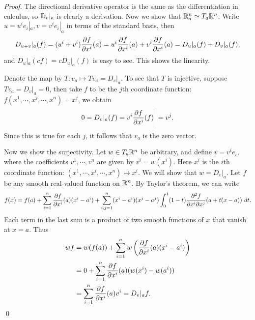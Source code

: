 \begin{proof}
    The directional derivative operator is the same as the differentiation in calculus, so $\mathbb{D}_v|_a$ is clearly a derivation. Now we show that $\mathbb{R}_a^n \simeq T_a \mathbb{R}^n$. Write $u = u^i e_i|_a, v = v^i e_i|_a$ in terms of the standard basis, then 
    $$D_{u+v}|_a(f) = (u^i+v^i){\pdv{f}{x^i}}(a) = u^i{\pdv{f}{x^i}}(a) + v^i{\pdv{f}{x^i}}(a) = D_u|_a(f) + D_v|_a(f), $$
    and $D_u|_a(cf) = cD_u|_a(f)$ is easy to see. This shows the linearity. 

    Denote the map by $T: v_a \mapsto Tv_a = D_v|_a$. To see that $T$ is injective, suppose $Tv_a = D_v|_a = 0$, then take $f$ to be the $j$th coordinate function: $f(x^1, \cdots, x^j, \cdots, x^n) = x^j$, we obtain
    $$0 = D_v|_a(f) = v^i {\pdv{f}{x^i}}(f)\bigg| = v^j. $$
    Since this is true for each $j$, it follows that $v_a$ is the zero vector. 

    Now we show the surjectivity. Let $w \in T_a\mathbb{R}^n$ be arbitrary, and define $v = v^i e_i$, where the coefficients $v^1, \cdots, v^n$ are given by 
    $v^i = w(x^i)$. Here $x^i$ is the $i$th coordinate function: $(x^1,\cdots,x^i,\cdots,x^n) \mapsto x^i$. We will show that $w = D_v|_a$.
    Let $f$ be any smooth real-valued function on $\mathbb{R}^n$. By Taylor's theorem, we can write
    \begin{align*}
    f(x)=f(a) + \sum_{i=1}^{n}{\pdv{f}{x^i}}(a)(x^i-a^i) + \sum_{i,j=1}^{n}(x^i-a^i)(x^j-a^j)\int_0^1 (1-t){\pdv[2]{f}{x^i}{x^j}} (a+t(x-a))~dt.
    \end{align*}
    Each term in the last sum is a product of two smooth functions of $x$ that vanish at $x=a$. Thus 
    \begin{align*}
    wf &= w(f(a)) + \sum_{i=1}^{n} w\left({\pdv{f}{x^i}}(a)(x^i-a^i)\right) \\
    &= 0 + \sum_{i=1}^{n} {\pdv{f}{x^i}}(a)(w(x^i)-w(a^i)) \\
    &= \sum_{i=1}^{n} {\pdv{f}{x^i}}(a)v^i = D_v|_a f. 
    \end{align*} \qed 
\end{proof}  

